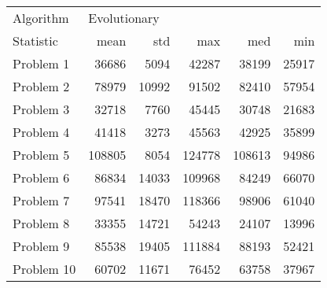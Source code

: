 \begin{tabular}{lrrrrr}
\toprule
Algorithm & \multicolumn{5}{l}{Evolutionary} \\
Statistic &         mean &    std &     max &     med &    min \\
\midrule
Problem 1  &        36686 &   5094 &   42287 &   38199 &  25917 \\
Problem 2  &        78979 &  10992 &   91502 &   82410 &  57954 \\
Problem 3  &        32718 &   7760 &   45445 &   30748 &  21683 \\
Problem 4  &        41418 &   3273 &   45563 &   42925 &  35899 \\
Problem 5  &       108805 &   8054 &  124778 &  108613 &  94986 \\
Problem 6  &        86834 &  14033 &  109968 &   84249 &  66070 \\
Problem 7  &        97541 &  18470 &  118366 &   98906 &  61040 \\
Problem 8  &        33355 &  14721 &   54243 &   24107 &  13996 \\
Problem 9  &        85538 &  19405 &  111884 &   88193 &  52421 \\
Problem 10 &        60702 &  11671 &   76452 &   63758 &  37967 \\
\bottomrule
\end{tabular}
